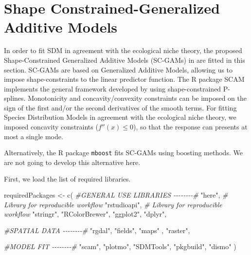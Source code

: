 \documentclass[
]{book}
\newenvironment{Shaded}{\begin{snugshade}}{\end{snugshade}}
\newcommand{\CommentTok}[1]{\textcolor[rgb]{0.56,0.35,0.01}{\textit{#1}}}
\newcommand{\FunctionTok}[1]{\textcolor[rgb]{0.00,0.00,0.00}{#1}}
\newcommand{\NormalTok}[1]{#1}
\newcommand{\OtherTok}[1]{\textcolor[rgb]{0.56,0.35,0.01}{#1}}
\newcommand{\StringTok}[1]{\textcolor[rgb]{0.31,0.60,0.02}{#1}}
\begin{document}
\hypertarget{shape-constrained-generalized-additive-models}{%
\chapter{Shape Constrained-Generalized Additive Models}\label{shape-constrained-generalized-additive-models}}

In order to fit SDM in agreement with the ecological niche theory, the proposed Shape-Constrained Generalized Additive Models (SC-GAMs) in \citep{citores_etal_2020} are fitted in this section. SC-GAMs are based on Generalized Additive Models, allowing us to impose shape-constraints to the linear predictor function. The R package SCAM implements the general framework developed by \citep{pya_etal_2015} using shape-constrained P-splines. Monotonicity and concavity/convexity constraints can be imposed on the sign of the first and/or the second derivatives of the smooth terms. For fitting Species Distribution Models in agreement with the ecological niche theory, we imposed concavity constraints (\(f''(x) \le 0\)), so that the response can presents at most a single mode.

Alternatively, the R package \texttt{mboost} fits SC-GAMs using boosting methods. We are not going to develop this alternative here.

First, we load the list of required libraries.

\begin{Shaded}
\begin{Highlighting}[]
\NormalTok{requiredPackages }\OtherTok{\textless{}{-}} \FunctionTok{c}\NormalTok{(}
  \CommentTok{\#GENERAL USE LIBRARIES {-}{-}{-}{-}{-}{-}{-}{-}\#}
  \StringTok{"here"}\NormalTok{, }\CommentTok{\# Library for reproducible workflow}
  \StringTok{"rstudioapi"}\NormalTok{,  }\CommentTok{\# Library for reproducible workflow}
  \StringTok{"stringr"}\NormalTok{,}
  \StringTok{"RColorBrewer"}\NormalTok{,  }
  \StringTok{"ggplot2"}\NormalTok{,}
  \StringTok{"dplyr"}\NormalTok{,}
  
  \CommentTok{\#SPATIAL DATA {-}{-}{-}{-}{-}{-}{-}{-}\#}
  \StringTok{"rgdal"}\NormalTok{,}
  \StringTok{"fields"}\NormalTok{,}
  \StringTok{"maps"}\NormalTok{ ,}
  \StringTok{"raster"}\NormalTok{,}

  \CommentTok{\#MODEL FIT {-}{-}{-}{-}{-}{-}{-}{-}\#}
  \StringTok{"scam"}\NormalTok{,}
  \StringTok{"plotmo"}\NormalTok{,}
  \StringTok{"SDMTools"}\NormalTok{,}
  \StringTok{"pkgbuild"}\NormalTok{,}
  \StringTok{"dismo"}
\NormalTok{  )}
\end{Highlighting}
\end{Shaded}
\end{document}
